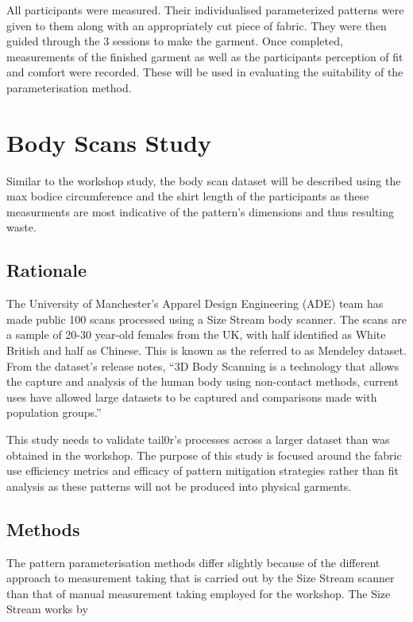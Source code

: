 All participants were measured. Their individualised parameterized patterns were given to them along with an appropriately cut piece of fabric. They were then guided through the 3 sessions to make the garment. Once completed, measurements of the finished garment as well as the participants perception of fit and comfort were recorded. These will be used in evaluating the suitability of the parameterisation method.

\section{Body Scans Study}
Similar to the workshop study, the body scan dataset will be described using the max bodice circumference and the shirt length of the participants as these measurments are most indicative of the pattern's dimensions and thus resulting waste.

\subsection{Rationale}
The University of Manchester’s Apparel Design Engineering (ADE) team has made public 100 scans processed using a Size Stream body scanner. The scans are a sample of 20-30 year-old females from the UK, with half identified as White British and half as Chinese. This is known as the referred to as Mendeley dataset. From the dataset’s release notes, “3D Body Scanning is a technology that allows the capture and analysis of the human body using non-contact methods, current uses have allowed large datasets to be captured and comparisons made with population groups.”

This study needs to validate tail0r's processes across a larger dataset than was obtained in the workshop. The purpose of this study is focused around the fabric use efficiency metrics and efficacy of pattern mitigation strategies rather than fit analysis as these patterns will not be produced into physical garments.

\subsection{Methods}
The pattern parameterisation methods differ slightly because of the different approach to measurement taking that is carried out by the Size Stream scanner than that of manual measurement taking employed for the workshop. The Size Stream works by

